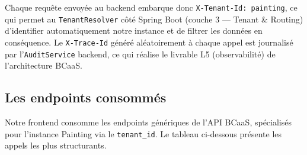 \documentclass[12pt,a4paper]{report}
\begin{document}
Chaque requête envoyée au backend embarque donc \texttt{X-Tenant-Id:
painting}, ce qui permet au \texttt{TenantResolver} côté Spring Boot (couche
3 --- Tenant \& Routing) d'identifier automatiquement notre instance et de
filtrer les données en conséquence. Le \texttt{X-Trace-Id} généré
aléatoirement à chaque appel est journalisé par l'\texttt{AuditService}
backend, ce qui réalise le livrable L5 (observabilité) de l'architecture
BCaaS.

\subsection*{Les endpoints consommés}

Notre frontend consomme les endpoints génériques de l'API BCaaS, spécialisés
pour l'instance Painting via le \texttt{tenant\_id}. Le tableau
ci-dessous présente les appels les plus structurants.
\end{document}
